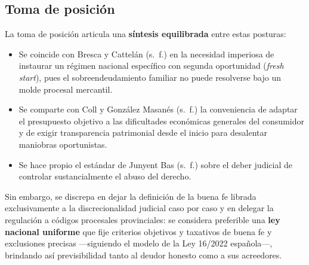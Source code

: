 \documentclass[12pt,oneside]{book}
\begin{document}
\subsection{Toma de posición}

La toma de posición articula una \textbf{síntesis equilibrada} entre estas posturas:

\begin{itemize}
    \item Se coincide con Bresca y Cattelán (s.~f.) en la necesidad imperiosa de instaurar un régimen nacional específico con segunda oportunidad (\textit{fresh start}), pues el sobreendeudamiento familiar no puede resolverse bajo un molde procesal mercantil.
    \item Se comparte con Coll y González Masanés (s.~f.) la conveniencia de adaptar el presupuesto objetivo a las dificultades económicas generales del consumidor y de exigir transparencia patrimonial desde el inicio para desalentar maniobras oportunistas.
    \item Se hace propio el estándar de Junyent Bas (s.~f.) sobre el deber judicial de controlar sustancialmente el abuso del derecho.
\end{itemize}

Sin embargo, se discrepa en dejar la definición de la buena fe librada exclusivamente a la discrecionalidad judicial caso por caso y en delegar la regulación a códigos procesales provinciales: se considera preferible una \textbf{ley nacional uniforme} que fije criterios objetivos y taxativos de buena fe y exclusiones precisas ---siguiendo el modelo de la Ley 16/2022 española---, brindando así previsibilidad tanto al deudor honesto como a sus acreedores.
\end{document}
